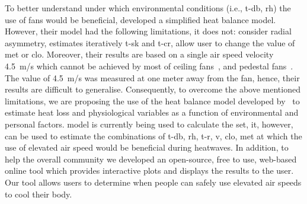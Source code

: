 To better understand under which environmental conditions (i.e., \ac{t-db}, \ac{rh}) the use of fans would be beneficial,  developed a simplified heat balance model.
However, their model had the following limitations, it does not: consider radial asymmetry, estimates iteratively \ac{t-sk} and \ac{t-cr}, allow user to change the value of \ac{met} or \ac{clo}.
Moreover, their results are based on a single air speed velocity 4.5~m/s which cannot be achieved by most of ceiling fans~\cite{Raftery2019}, and pedestal fans~\cite{Yang2015a}.
The value of 4.5~m/s was measured at one meter away from the fan, hence, their results are difficult to generalise.
Consequently, to overcome the above mentioned limitations, we are proposing the use of the heat balance model developed by~ to estimate heat loss and physiological variables as a function of environmental and personal factors.
 model is currently being used to calculate the \ac{set}, it, however, can be used to estimate the combinations of \ac{t-db}, \ac{rh}, \ac{t-r}, \ac{v}, \ac{clo}, \ac{met} at which the use of elevated air speed would be beneficial during heatwaves.
In addition, to help the overall community we developed an open-source, free to use, web-based online tool which provides interactive plots and displays the results to the user.
Our tool allows users to determine when people can safely use elevated air speeds to cool their body.

